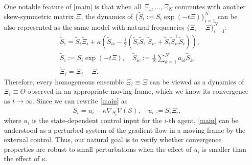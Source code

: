 \documentclass[11pt,reqno]{amsart}
\numberwithin{figure}{section}
\newcommand{\kp}{\kappa}
\newcommand{\St}{  {\textup{St}}(p,n) }
\newcommand{\init}{  {\textup{in}} }
\begin{document}
{ One notable feature of \eqref{main} is that when all $\Xi_1,\ldots,\Xi_N$ commutes with another skew-symmetric matrix $\Xi$, the dynamics of $\{\tilde{S}_i:=S_i\exp(-t\Xi)\}_{i=1}^N$ can be also represented as the same model with natural frequencies $\{\Xi_i-\Xi\}_{i=1}^N$:
	\begin{equation}\label{main-3}
	\begin{aligned}
	&\dot{\tilde{S}}_i=\tilde{S}_i \tilde{\Xi}_i+\kappa \left( \tilde{S}_{ic} - \frac12( \tilde{S}_i\tilde{S}_i^\top \tilde{S}_{ic} + \tilde{S}_i \tilde{S}_{ic}^\top \tilde{S}_i) \right),\\
	&\tilde{S}_i:=S_i\exp(-t\Xi),\quad \tilde{S}_{ic} :=\frac{1}{N}\sum_{k=1}^Na_{ik}\tilde{S}_k,\\
	&\tilde{\Xi}_i=\Xi_i-\Xi.
	\end{aligned}
	\end{equation}
	Therefore,  every homogeneous ensemble $\Xi_i\equiv \Xi$ can be viewed as a dynamics of $\Xi_i\equiv O$ observed in an appropriate moving frame, which we know its convergence as $t\to\infty$.} Since we can rewrite  \eqref{main} as 
\[
\dot S_i = u_i -\kp \nabla_{S_i} \mathcal V(\mathcal S),\quad u_i := S_i\Xi_i,
\]
where $u_i$ is the state-dependent control input for the $i$-th agent, \eqref{main} can be understood as a perturbed system of the gradient flow  in a moving frame by the external control. Thus, our natural goal is to verify whether convergence properties are robust to small perturbations when the effect of $u_i$ is smaller than the effect of $\kappa$.
\end{document}
